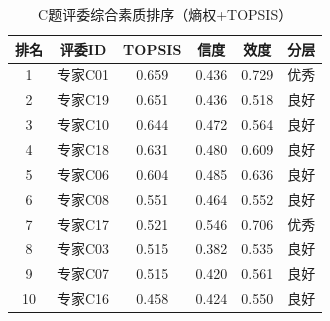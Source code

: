 \begin{table}[h]
\centering
\caption{C题评委综合素质排序（熵权+TOPSIS）}
\begin{tabular}{cccccc}
\hline
排名 & 评委ID & TOPSIS & 信度 & 效度 & 分层 \\
\hline
1 & 专家C01 & 0.659 & 0.436 & 0.729 & 优秀 \\
2 & 专家C19 & 0.651 & 0.436 & 0.518 & 良好 \\
3 & 专家C10 & 0.644 & 0.472 & 0.564 & 良好 \\
4 & 专家C18 & 0.631 & 0.480 & 0.609 & 良好 \\
5 & 专家C06 & 0.604 & 0.485 & 0.636 & 良好 \\
6 & 专家C08 & 0.551 & 0.464 & 0.552 & 良好 \\
7 & 专家C17 & 0.521 & 0.546 & 0.706 & 优秀 \\
8 & 专家C03 & 0.515 & 0.382 & 0.535 & 良好 \\
9 & 专家C07 & 0.515 & 0.420 & 0.561 & 良好 \\
10 & 专家C16 & 0.458 & 0.424 & 0.550 & 良好 \\
\hline
\end{tabular}
\end{table}